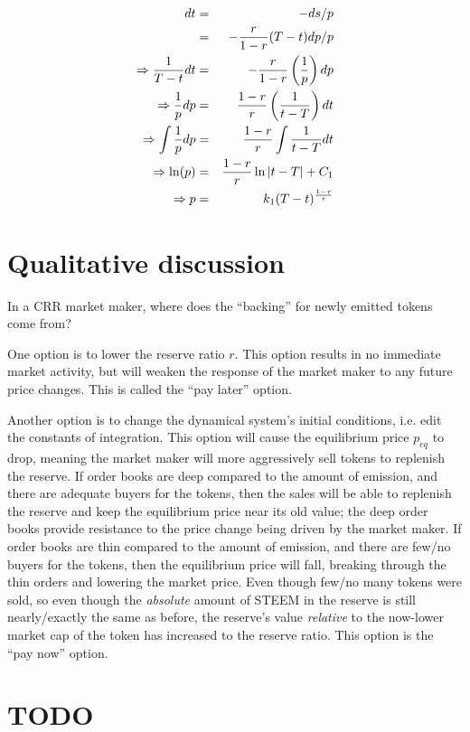 \documentclass{article}
\begin{document}
\begin{eqnarray*}
dt & = & -ds / p \\
   & = & -{r \over 1-r} (T - t) dp / p \\
\Rightarrow {1 \over T-t} dt & = & -{r \over 1-r} \left( {1 \over p} \right) dp \\
\Rightarrow {1 \over p} dp & = & {1-r \over r} \left( {1 \over t-T} \right) dt \\
\Rightarrow \int {1 \over p} dp & = & {1-r \over r} \int {1 \over t-T} dt \\
\Rightarrow \ln(p) & = & {1-r \over r} \ln | t-T | + C_1 \\
\Rightarrow p & = & k_1 (T-t)^{1-r \over r}
\end{eqnarray*}

\section{Qualitative discussion}

In a CRR market maker, where does the ``backing'' for newly emitted tokens come from?

One option is to lower the reserve ratio $r$.  This option results in no immediate market
activity, but will weaken the response of the market maker to any future price changes.
This is called the ``pay later'' option.

Another option is to change the dynamical system's initial conditions, i.e. edit the
constants of integration.  This option will cause the equilibrium price $p_{eq}$ to drop,
meaning the market maker will more aggressively sell tokens to replenish the reserve.
If order books are deep compared to the amount of emission, and there are adequate buyers
for the tokens, then the sales will be able to replenish the reserve and keep the equilibrium
price near its old value; the deep order books provide resistance to the price change being
driven by the market maker.  If order books are thin compared to the amount of emission,
and there are few/no buyers for the tokens, then the equilibrium price will fall, breaking
through the thin orders and lowering the market price.  Even though few/no many tokens were
sold, so even though the \textit{absolute} amount of STEEM in the reserve is still
nearly/exactly the same as before, the reserve's value \textit{relative} to the now-lower
market cap of the token has increased to the reserve ratio.  This option is the ``pay now''
option.




\section{TODO}
\end{document}
